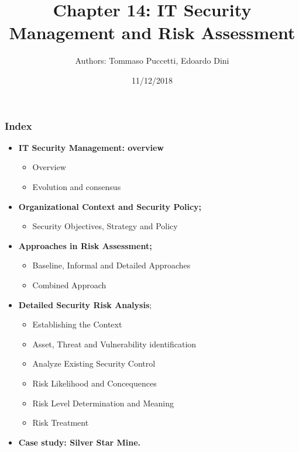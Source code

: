 \documentclass[xcolor ={table,usenames,dvipsnames}]{beamer}
\title{Chapter 14: IT Security Management and Risk Assessment}
\author{Authors: Tommaso Puccetti, Edoardo Dini}
\institute{Universit\`a  degli Studi di Firenze}
\date{11/12/2018}
\theoremstyle{definition}
\begin{document}
	
	\begin{frame}
		\maketitle
	\end{frame}
	
		\begin{frame}
		\frametitle{Index}
		\begin{itemize}
			\item  \textbf{IT Security Management: overview}
			\begin{itemize}
				\item Overview
				\item Evolution and consensus
			\end{itemize}
			\item   \textbf{Organizational Context and Security Policy;}
			\begin{itemize}
				\item Security Objectives, Strategy and Policy
			\end{itemize}
			\item   \textbf{Approaches in Risk Assessment;}
			\begin{itemize}
				\item Baseline, Informal and Detailed Approaches
				\item Combined Approach
			\end{itemize}
			\item  \textbf{Detailed Security Risk Analysis};
			\begin{itemize}
				\item Establishing the Context
				\item Asset, Threat and Vulnerability identification
				\item Analyze Existing Security Control
				\item Risk Likelihood and Concequences
				\item Risk Level Determination and Meaning
				\item Risk Treatment
			\end{itemize}
			\item  \textbf{Case study: Silver Star Mine.}
		\end{itemize}
	\end{frame}
		
\end{document}
